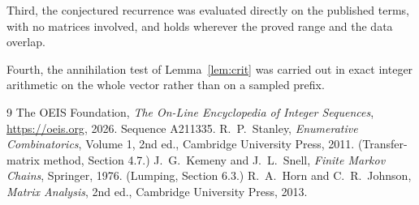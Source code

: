 \documentclass[11pt,a4paper]{article}
\theoremstyle{plain}
\theoremstyle{definition}
\begin{document}
Third, the conjectured recurrence was evaluated directly on the published terms, with no
matrices involved, and holds wherever the proved range and the data overlap.

Fourth, the annihilation test of Lemma~\ref{lem:crit} was carried out in exact integer
arithmetic on the whole vector rather than on a sampled prefix.

\begin{thebibliography}{9}
 The OEIS Foundation, \emph{The On-Line Encyclopedia of Integer
Sequences}, \url{https://oeis.org}, 2026. Sequence A211335.
 R.~P.~Stanley, \emph{Enumerative Combinatorics}, Volume 1, 2nd ed.,
Cambridge University Press, 2011. (Transfer-matrix method, Section 4.7.)
 J.~G.~Kemeny and J.~L.~Snell, \emph{Finite Markov Chains}, Springer, 1976.
(Lumping, Section 6.3.)
 R.~A.~Horn and C.~R.~Johnson, \emph{Matrix Analysis}, 2nd ed., Cambridge
University Press, 2013.
\end{thebibliography}
\end{document}
